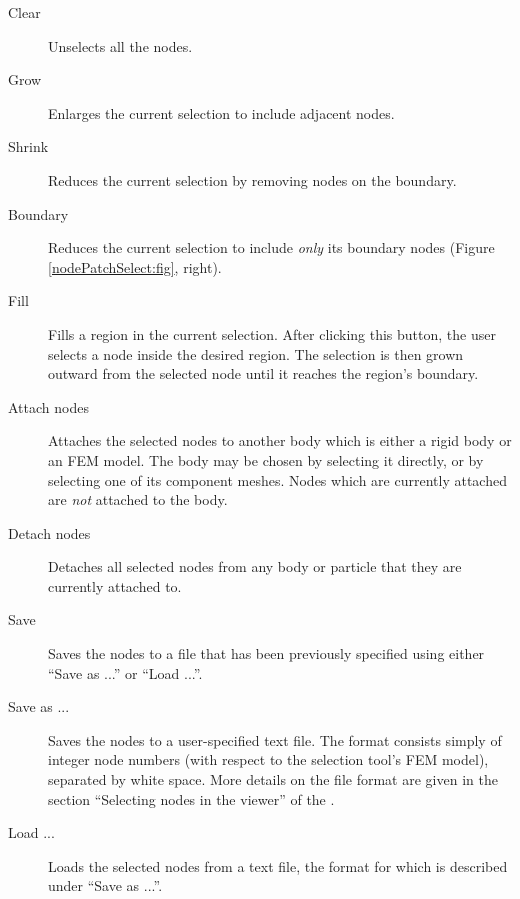 \documentclass{article}
\begin{document}
\begin{description}

\item[Clear]\mbox{}

Unselects all the nodes.

\item[Grow]\mbox{}

Enlarges the current selection to include adjacent nodes.

\item[Shrink]\mbox{}

Reduces the current selection by removing nodes on the boundary.

\item[Boundary]\mbox{}

Reduces the current selection to include {\it only} its boundary
nodes (Figure \ref{nodePatchSelect:fig}, right).

\item[Fill]\mbox{}

Fills a region in the current selection. After clicking this button,
the user selects a node inside the desired region. The selection is
then grown outward from the selected node until it reaches the
region's boundary.

\item[Attach nodes]\mbox{}

Attaches the selected nodes to another body which is either a rigid
body or an FEM model. The body may be chosen by selecting it directly,
or by selecting one of its component meshes. Nodes which are currently
attached are {\it not} attached to the body.

\item[Detach nodes]\mbox{}

Detaches all selected nodes from any body or particle that they are
currently attached to.

\item[Save]\mbox{}

Saves the nodes to a file that has been previously specified
using either ``{\sf Save as ...}'' or ``{\sf Load ...}''.

\item[Save as ...]\mbox{}

Saves the nodes to a user-specified text file. The format consists
simply of integer node numbers (with respect to the selection tool's
FEM model), separated by white space. More details on the file format
are given in the section ``Selecting nodes in the viewer'' of the
.

\item[Load ...]\mbox{}

Loads the selected nodes from a text file, the format for which is
described under ``{\sf Save as ...}''.

\end{description}
\end{document}
